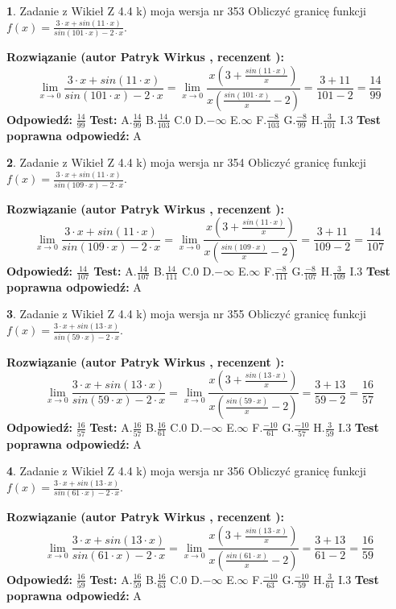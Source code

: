 \documentclass[12pt, a4paper]{article}
\theoremstyle{definition} %
\newtheorem{zad}{}
\newcommand{\zadStart}[1]{\begin{zad}#1\newline}
\newcommand{\zadStop}{\end{zad}}
\newcommand{\rozwStart}[2]{\noindent \textbf{Rozwiązanie (autor #1 , recenzent #2): }\newline}
\newcommand{\rozwStop}{\newline}
\newcommand{\odpStart}{\noindent \textbf{Odpowiedź:}\newline}
\newcommand{\odpStop}{\newline}
\newcommand{\testStart}{\noindent \textbf{Test:}\newline}
\newcommand{\testStop}{\newline}
\newcommand{\kluczStart}{\noindent \textbf{Test poprawna odpowiedź:}\newline}
\newcommand{\kluczStop}{\newline}
\begin{document}
\zadStart{Zadanie z Wikieł Z 4.4 k) moja wersja nr 353}
Obliczyć granicę funkcji $f(x)=\frac{3\cdot x +sin(11\cdot x)}{sin(101\cdot x) -2\cdot x}$.
\zadStop
\rozwStart{Patryk Wirkus}{}
$$\lim\limits_{x\to 0}\frac{3\cdot x +sin(11\cdot x)}{sin(101\cdot x) -2\cdot x}
=\lim\limits_{x\to 0}\frac{x(3+\frac{sin(11\cdot x)}{x})}{x(\frac{sin(101\cdot x)}{x}-2)}
=\frac{3+11}{101-2} = \frac{14}{99}$$
\rozwStop
\odpStart
$\frac{14}{99}$
\odpStop
\testStart
A.$\frac{14}{99}$
B.$\frac{14}{103}$
C.$0$
D.$-\infty$
E.$\infty$
F.$\frac{-8}{103}$
G.$\frac{-8}{99}$
H.$\frac{3}{101}$
I.$3$
\testStop
\kluczStart
A
\kluczStop



\zadStart{Zadanie z Wikieł Z 4.4 k) moja wersja nr 354}
Obliczyć granicę funkcji $f(x)=\frac{3\cdot x +sin(11\cdot x)}{sin(109\cdot x) -2\cdot x}$.
\zadStop
\rozwStart{Patryk Wirkus}{}
$$\lim\limits_{x\to 0}\frac{3\cdot x +sin(11\cdot x)}{sin(109\cdot x) -2\cdot x}
=\lim\limits_{x\to 0}\frac{x(3+\frac{sin(11\cdot x)}{x})}{x(\frac{sin(109\cdot x)}{x}-2)}
=\frac{3+11}{109-2} = \frac{14}{107}$$
\rozwStop
\odpStart
$\frac{14}{107}$
\odpStop
\testStart
A.$\frac{14}{107}$
B.$\frac{14}{111}$
C.$0$
D.$-\infty$
E.$\infty$
F.$\frac{-8}{111}$
G.$\frac{-8}{107}$
H.$\frac{3}{109}$
I.$3$
\testStop
\kluczStart
A
\kluczStop



\zadStart{Zadanie z Wikieł Z 4.4 k) moja wersja nr 355}
Obliczyć granicę funkcji $f(x)=\frac{3\cdot x +sin(13\cdot x)}{sin(59\cdot x) -2\cdot x}$.
\zadStop
\rozwStart{Patryk Wirkus}{}
$$\lim\limits_{x\to 0}\frac{3\cdot x +sin(13\cdot x)}{sin(59\cdot x) -2\cdot x}
=\lim\limits_{x\to 0}\frac{x(3+\frac{sin(13\cdot x)}{x})}{x(\frac{sin(59\cdot x)}{x}-2)}
=\frac{3+13}{59-2} = \frac{16}{57}$$
\rozwStop
\odpStart
$\frac{16}{57}$
\odpStop
\testStart
A.$\frac{16}{57}$
B.$\frac{16}{61}$
C.$0$
D.$-\infty$
E.$\infty$
F.$\frac{-10}{61}$
G.$\frac{-10}{57}$
H.$\frac{3}{59}$
I.$3$
\testStop
\kluczStart
A
\kluczStop



\zadStart{Zadanie z Wikieł Z 4.4 k) moja wersja nr 356}
Obliczyć granicę funkcji $f(x)=\frac{3\cdot x +sin(13\cdot x)}{sin(61\cdot x) -2\cdot x}$.
\zadStop
\rozwStart{Patryk Wirkus}{}
$$\lim\limits_{x\to 0}\frac{3\cdot x +sin(13\cdot x)}{sin(61\cdot x) -2\cdot x}
=\lim\limits_{x\to 0}\frac{x(3+\frac{sin(13\cdot x)}{x})}{x(\frac{sin(61\cdot x)}{x}-2)}
=\frac{3+13}{61-2} = \frac{16}{59}$$
\rozwStop
\odpStart
$\frac{16}{59}$
\odpStop
\testStart
A.$\frac{16}{59}$
B.$\frac{16}{63}$
C.$0$
D.$-\infty$
E.$\infty$
F.$\frac{-10}{63}$
G.$\frac{-10}{59}$
H.$\frac{3}{61}$
I.$3$
\testStop
\kluczStart
A
\kluczStop
\end{document}

